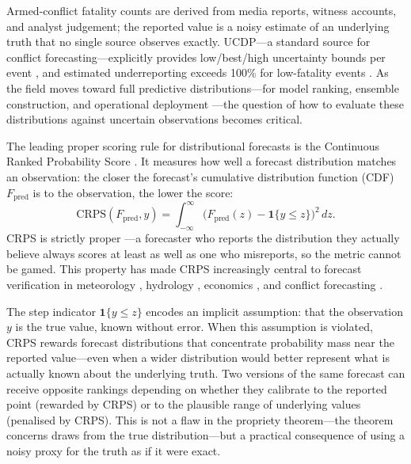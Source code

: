 Armed-conflict fatality counts are derived from media reports, witness accounts, and analyst judgement; the reported value is a noisy estimate of an underlying truth that no single source observes exactly. UCDP---a standard source for conflict forecasting---explicitly provides low/best/high uncertainty bounds per event \citep{ucdp_codebook}, and estimated underreporting exceeds 100\% for low-fatality events \citep{vesco2026uncertainty}. As the field moves toward full predictive distributions---for model ranking, ensemble construction, and operational deployment \citep{hegre2025prediction}---the question of how to evaluate these distributions against uncertain observations becomes critical.

The leading proper scoring rule for distributional forecasts is the Continuous Ranked Probability Score \citep[CRPS;][]{matheson1976scoring,hersbach2000decomposition}. It measures how well a forecast distribution matches an observation: the closer the forecast's cumulative distribution function (CDF) $F_\text{pred}$ is to the observation, the lower the score:
%
\begin{equation}
    \text{CRPS}(F_\text{pred}, y) = \int_{-\infty}^{\infty} \bigl( F_\text{pred}(z) - \mathbf{1}\{y \le z\} \bigr)^2 \, dz.
\end{equation}
%
CRPS is strictly proper \citep{gneiting2007strictly}---a forecaster who reports the distribution they actually believe always scores at least as well as one who misreports, so the metric cannot be gamed. This property has made CRPS increasingly central to forecast verification in meteorology \citep{candille2005evaluation,jordan2019evaluating}, hydrology \citep{laio2007verification}, economics \citep{gneiting2011comparing}, and conflict forecasting \citep{hegre2019views}.

The step indicator $\mathbf{1}\{y \le z\}$ encodes an implicit assumption: that the observation $y$ is the true value, known without error. When this assumption is violated, CRPS rewards forecast distributions that concentrate probability mass near the reported value---even when a wider distribution would better represent what is actually known about the underlying truth. Two versions of the same forecast can receive opposite rankings depending on whether they calibrate to the reported point (rewarded by CRPS) or to the plausible range of underlying values (penalised by CRPS). This is not a flaw in the propriety theorem---the theorem concerns draws from the true distribution---but a practical consequence of using a noisy proxy for the truth as if it were exact.

